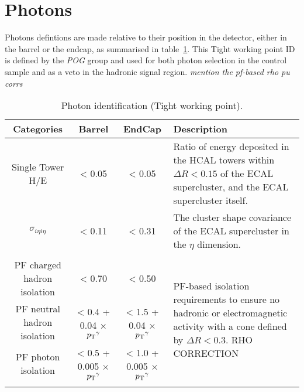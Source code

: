
\section{Photons}  %
\label{sec:objects_photons}

Photons defintions are made relative to their position in the detector, either 
in the barrel or the endcap, as summarised in table~\ref{tab:photon-id-egamma}. 
This Tight working point ID is defined by the \emph{POG} group and used for both photon
selection in the \gj control sample and as a veto in the hadronic signal region.
\emph{mention the pf-based rho pu corrs}

\begin{table}[ht!]
  \caption{Photon identification (Tight working point).\label{tab:photon-id-egamma}}
  \centering
  \scriptsize
  \begin{tabular}{ cccp{4cm} }
    \hline
    \hline
    Categories                    & Barrel                             & EndCap 
    & Description                         \\
    \hline
    Single Tower H/E              & < 0.05                               & < 0.05                               
    & Ratio of energy deposited in the HCAL towers within $\Delta R<0.15$ of the ECAL 
    supercluster, and the ECAL supercluster itself. \\
    $\sigma_{i\eta i\eta}$        & < 0.11                               & < 0.31 & 
    The cluster shape covariance of the ECAL supercluster in the $\eta$
    dimension. \\
    &&&\multirow{5}{4cm}{PF-based isolation requirements to ensure no hadronic or electromagnetic 
    activity with a cone defined by $\Delta R < 0.3$. RHO CORRECTION}\\
    PF charged hadron isolation   & < 0.70                               & < 0.50                               & \\
    PF neutral hadron isolation   & < 0.4 + 0.04 $\times$ ${p_{\text T}}^{\gamma}$  & < 1.5 + 0.04 $\times$ ${p_{\text T}}^{\gamma}$&
    \\
    PF photon isolation           & < 0.5 + 0.005 $\times$ ${p_{\text T}}^{\gamma}$ & < 1.0 + 0.005 $\times$ ${p_{\text T}}^{\gamma}$& \\
    \\
    \hline
    \hline
  \end{tabular}
\end{table}


